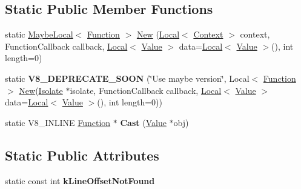\subsection*{Static Public Member Functions}
\begin{DoxyCompactItemize}
\item 
static \hyperlink{classv8_1_1MaybeLocal}{Maybe\+Local}$<$ \hyperlink{classv8_1_1Function}{Function} $>$ \hyperlink{classv8_1_1Function_a53f1f98d49eef79339460e47f2b1e29e}{New} (\hyperlink{classv8_1_1Local}{Local}$<$ \hyperlink{classv8_1_1Context}{Context} $>$ context, Function\+Callback callback, \hyperlink{classv8_1_1Local}{Local}$<$ \hyperlink{classv8_1_1Value}{Value} $>$ data=\hyperlink{classv8_1_1Local}{Local}$<$ \hyperlink{classv8_1_1Value}{Value} $>$(), int length=0)
\item 
static {\bfseries V8\+\_\+\+D\+E\+P\+R\+E\+C\+A\+T\+E\+\_\+\+S\+O\+ON} (\char`\"{}Use maybe version\char`\"{}, Local$<$ \hyperlink{classv8_1_1Function}{Function} $>$ \hyperlink{classv8_1_1Function_a53f1f98d49eef79339460e47f2b1e29e}{New}(\hyperlink{classv8_1_1Isolate}{Isolate} $\ast$isolate, Function\+Callback callback,                                                                                               \hyperlink{classv8_1_1Local}{Local}$<$ \hyperlink{classv8_1_1Value}{Value} $>$ data=\hyperlink{classv8_1_1Local}{Local}$<$ \hyperlink{classv8_1_1Value}{Value} $>$(), int length=0))\hypertarget{classv8_1_1Function_ac6281ad77b5f3ab414b7fd315471326d}{}\label{classv8_1_1Function_ac6281ad77b5f3ab414b7fd315471326d}

\item 
static V8\+\_\+\+I\+N\+L\+I\+NE \hyperlink{classv8_1_1Function}{Function} $\ast$ {\bfseries Cast} (\hyperlink{classv8_1_1Value}{Value} $\ast$obj)\hypertarget{classv8_1_1Function_af24f38bcc0769519816cda1f6a154ff8}{}\label{classv8_1_1Function_af24f38bcc0769519816cda1f6a154ff8}

\end{DoxyCompactItemize}
\subsection*{Static Public Attributes}
\begin{DoxyCompactItemize}
\item 
static const int {\bfseries k\+Line\+Offset\+Not\+Found}\hypertarget{classv8_1_1Function_acf0af24f79908e405a6ac435277596d9}{}\label{classv8_1_1Function_acf0af24f79908e405a6ac435277596d9}

\end{DoxyCompactItemize}


